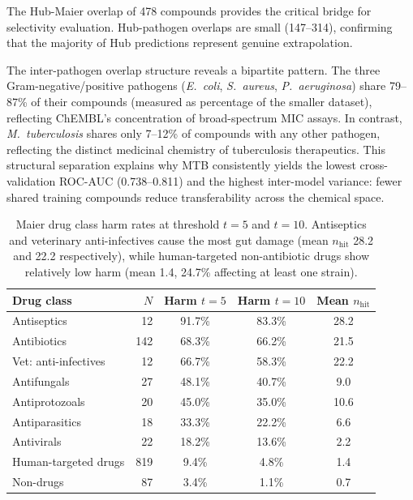 \documentclass{article}
\begin{document}
The Hub-Maier overlap of 478 compounds provides the critical bridge for selectivity evaluation.
Hub-pathogen overlaps are small (147--314), confirming that the majority of Hub predictions represent genuine extrapolation.

The inter-pathogen overlap structure reveals a bipartite pattern. The three Gram-negative/positive pathogens (\textit{E.~coli}, \textit{S.~aureus}, \textit{P.~aeruginosa}) share 79--87\% of their compounds (measured as percentage of the smaller dataset), reflecting ChEMBL's concentration of broad-spectrum MIC assays. In contrast, \textit{M.~tuberculosis} shares only 7--12\% of compounds with any other pathogen, reflecting the distinct medicinal chemistry of tuberculosis therapeutics. This structural separation explains why MTB consistently yields the lowest cross-validation ROC-AUC (0.738--0.811) and the highest inter-model variance: fewer shared training compounds reduce transferability across the chemical space.

\begin{table}[ht]
\caption{Maier drug class harm rates at threshold $t{=}5$ and $t{=}10$. Antiseptics and veterinary anti-infectives cause the most gut damage (mean $n_{\mathrm{hit}}$ 28.2 and 22.2 respectively), while human-targeted non-antibiotic drugs show relatively low harm (mean 1.4, 24.7\% affecting at least one strain).}
\label{tab:maier_drug_class}
\centering
\scriptsize
\begin{tabular}{lrccc}
\toprule
\textbf{Drug class} & $N$ & \textbf{Harm $t{=}5$} & \textbf{Harm $t{=}10$} & \textbf{Mean $n_{\mathrm{hit}}$} \\
\midrule
Antiseptics & 12 & 91.7\% & 83.3\% & 28.2 \\
Antibiotics & 142 & 68.3\% & 66.2\% & 21.5 \\
Vet: anti-infectives & 12 & 66.7\% & 58.3\% & 22.2 \\
Antifungals & 27 & 48.1\% & 40.7\% & 9.0 \\
Antiprotozoals & 20 & 45.0\% & 35.0\% & 10.6 \\
Antiparasitics & 18 & 33.3\% & 22.2\% & 6.6 \\
Antivirals & 22 & 18.2\% & 13.6\% & 2.2 \\
Human-targeted drugs & 819 & 9.4\% & 4.8\% & 1.4 \\
Non-drugs & 87 & 3.4\% & 1.1\% & 0.7 \\
\bottomrule
\end{tabular}
\end{table}
\end{document}
